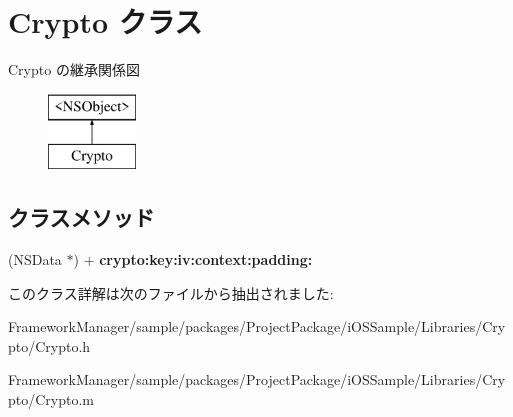 \hypertarget{interface_crypto}{}\section{Crypto クラス}
\label{interface_crypto}
Crypto の継承関係図\begin{figure}[H]
\begin{center}
\leavevmode
\includegraphics[height=2.000000cm]{interface_crypto}
\end{center}
\end{figure}
\subsection*{クラスメソッド}
\begin{DoxyCompactItemize}
\item 
\hypertarget{interface_crypto_a474ef123af91f98c96a28b518ec125ae}{}(N\+S\+Data $\ast$) + {\bfseries crypto\+:key\+:iv\+:context\+:padding\+:}\label{interface_crypto_a474ef123af91f98c96a28b518ec125ae}

\end{DoxyCompactItemize}


このクラス詳解は次のファイルから抽出されました\+:\begin{DoxyCompactItemize}
\item 
Framework\+Manager/sample/packages/\+Project\+Package/i\+O\+S\+Sample/\+Libraries/\+Crypto/Crypto.\+h\item 
Framework\+Manager/sample/packages/\+Project\+Package/i\+O\+S\+Sample/\+Libraries/\+Crypto/Crypto.\+m\end{DoxyCompactItemize}
